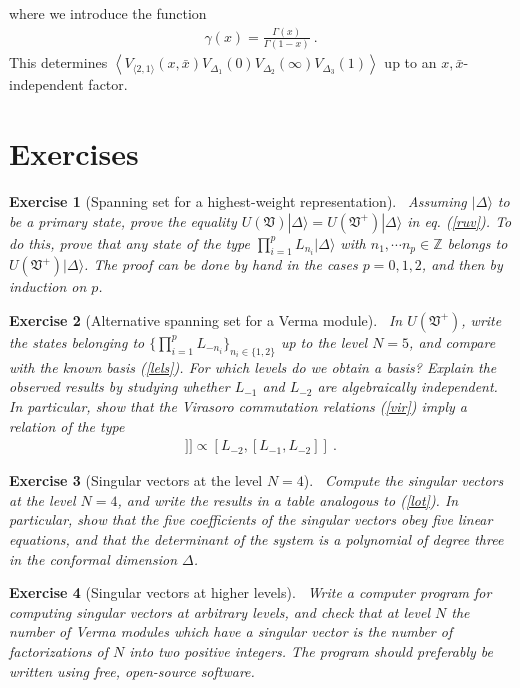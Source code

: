 \documentclass[12pt,a4paper,notitlepage]{report}
\newcommand \la {\left\langle}
\newcommand \ra {\right\rangle}
\newcommand \Z {\mathbb{Z}}
\numberwithin{equation}{section}
\theoremstyle{break}
\newtheorem{exo}{Exercise}[chapter]
\begin{document}
where we introduce the function
\begin{align}
 \gamma(x) = \frac{\Gamma(x)}{\Gamma(1-x)}\ .
\label{gx}
\end{align}
This determines $\la V_{\langle 2,1 \rangle}(x,\bar{x})V_{\Delta_1}(0)V_{\Delta_2}(\infty)V_{\Delta_3}(1)\ra$ up to an $x,\bar{x}$-independent factor. 


\section{Exercises}

\begin{exo}[Spanning set for a highest-weight representation]
 ~\label{exospan}
Assuming $|\Delta\rangle$ to be a primary state, prove the equality $U(\mathfrak{V})|\Delta\rangle =U(\mathfrak{V}^+)|\Delta\rangle$ in eq. (\ref{ruv}). To do this, prove that any state of the type $\prod_{i=1}^p L_{n_i}|\Delta\rangle$ with $n_1,\cdots n_p\in \Z$ belongs to $U(\mathfrak{V}^+)|\Delta\rangle$. The proof can be done by hand in the cases $p=0,1,2$, and then by induction on $p$.
\end{exo}

\begin{exo}[Alternative spanning set for a Verma module]
 ~\label{exoot}
In $U(\mathfrak{V}^+)$, write the states belonging to  $\{\prod_{i=1}^p L_{-n_i}\}_{n_i\in\{1,2\}}$ up to the level $N=5$, and compare with the known basis (\ref{lels}). For which levels do we obtain a basis? Explain the observed results by studying whether $L_{-1}$ and $L_{-2}$ are algebraically independent. In particular, show that the Virasoro commutation relations (\ref{vir}) imply a relation of the type
\begin{align}
 [L_{-1},[L_{-1},[L_{-1},L_{-2}]]] \propto [L_{-2},[L_{-1},L_{-2}]]\ .
\end{align}
\end{exo}

\begin{exo}[Singular vectors at the level $N=4$]
~\label{exolf}
 Compute the singular vectors at the level $N=4$, and write the results in a table analogous to (\ref{lot}). In particular, show that the five coefficients of the singular vectors obey five linear equations, and that the determinant of the system is a polynomial of degree three in the conformal dimension $\Delta$. 
\end{exo}

\begin{exo}[Singular vectors at higher levels]
~\label{exohl}
 Write a computer program for computing singular vectors at arbitrary levels, and check that at level $N$ the number of Verma modules which have a singular vector is the number of factorizations of $N$ into two positive integers. The program should preferably be written using free, open-source software.
\end{exo}
\end{document}
